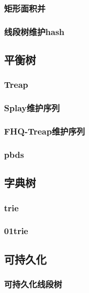 \documentclass[a4paper,twocolumn]{article}
\begin{document}
\subsubsection{矩形面积并}

\subsubsection{线段树维护hash}

\subsection{平衡树}
\subsubsection{Treap}

\subsubsection{Splay维护序列}

\subsubsection{FHQ-Treap维护序列}

\subsubsection{pbds}

\subsection{字典树}
\subsubsection{trie}

\subsubsection{01trie}

\subsection{可持久化}
\subsubsection{可持久化线段树}

\end{document}
